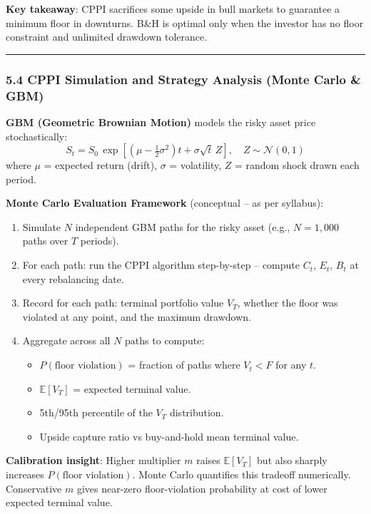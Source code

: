 \documentclass[
]{article}
\begin{document}
\textbf{Key takeaway}: CPPI sacrifices some upside in bull markets to guarantee a minimum floor in downturns. B\&H is optimal only when the investor has no floor constraint and unlimited drawdown tolerance.

\begin{center}\rule{0.5\linewidth}{0.5pt}\end{center}

\hypertarget{cppi-simulation-and-strategy-analysis-conceptual}{%
\subsubsection{5.4 CPPI Simulation and Strategy Analysis (Monte Carlo \& GBM)}\label{cppi-simulation-and-strategy-analysis-conceptual}}

\textbf{GBM (Geometric Brownian Motion)} models the risky asset price stochastically:
\[
S_t = S_0\,\exp\!\left[\left(\mu - \tfrac{1}{2}\sigma^2\right)t + \sigma\sqrt{t}\,Z\right], \quad Z\sim\mathcal{N}(0,1)
\]
where $\mu$ = expected return (drift), $\sigma$ = volatility, $Z$ = random shock drawn each period.

\textbf{Monte Carlo Evaluation Framework} (conceptual -- as per syllabus):
\begin{enumerate}
\item Simulate $N$ independent GBM paths for the risky asset (e.g., $N = 1{,}000$ paths over $T$ periods).
\item For each path: run the CPPI algorithm step-by-step -- compute $C_t$, $E_t$, $B_t$ at every rebalancing date.
\item Record for each path: terminal portfolio value $V_T$, whether the floor was violated at any point, and the maximum drawdown.
\item Aggregate across all $N$ paths to compute:
  \begin{itemize}
    \item $P(\text{floor violation})$ = fraction of paths where $V_t < F$ for any $t$.
    \item $\mathbb{E}[V_T]$ = expected terminal value.
    \item 5th/95th percentile of the $V_T$ distribution.
    \item Upside capture ratio vs buy-and-hold mean terminal value.
  \end{itemize}
\end{enumerate}

\textbf{Calibration insight}: Higher multiplier $m$ raises $\mathbb{E}[V_T]$ but also sharply increases $P(\text{floor violation})$. Monte Carlo quantifies this tradeoff numerically. Conservative $m$ gives near-zero floor-violation probability at cost of lower expected terminal value.
\end{document}
